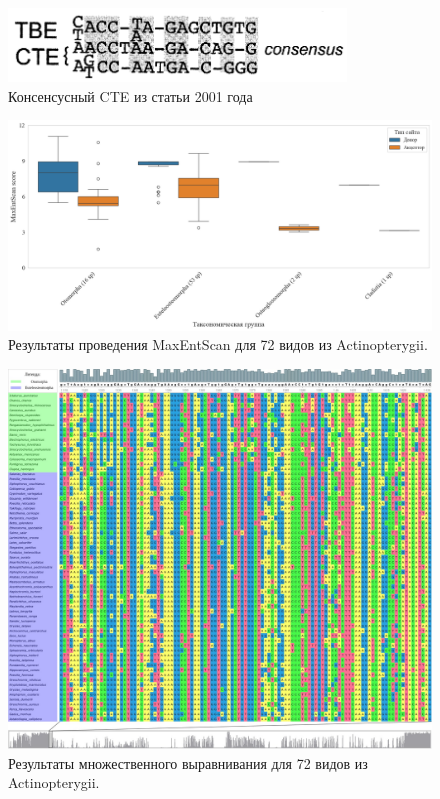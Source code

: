 \begin{figure}[h] %
    \centering
    \includegraphics[width=0.8\textwidth]{images/CTE_consensus}
    \caption{Консенсусный CTE из статьи 2001 года}
    \label{fig:CTE_consensus}
\end{figure}


\newpage
\begin{figure}[h] %
    \centering
    \includegraphics[width=1.0\textwidth]{images/Actinopterygii_maxentscan}
    \caption{Результаты проведения MaxEntScan для 72 видов из Actinopterygii.}
    \label{fig:Actinopterygii_maxentscan}
\end{figure}

\newpage
\begin{figure}[h] %
    \centering
    \includegraphics[width=1.0\textwidth]{images/Actinopterygii_alignment_ruler}
    \caption{Результаты множественного выравнивания для 72 видов из Actinopterygii.}
    \label{fig:Actinopterygii_alignment_ruler}
\end{figure}


